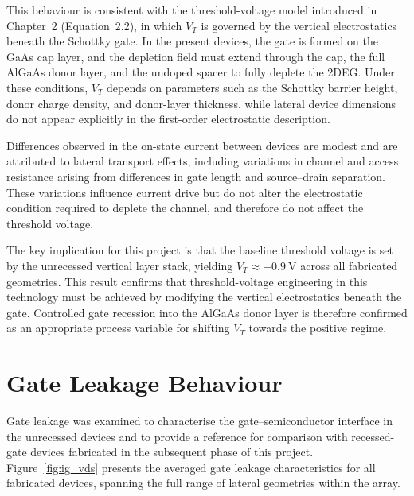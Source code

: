 \vspace{2mm}

This behaviour is consistent with the threshold-voltage model introduced in
Chapter~2 (Equation~2.2), in which $V_T$ is governed by the vertical
electrostatics beneath the Schottky gate. In the present devices, the gate is
formed on the GaAs cap layer, and the depletion field must extend through the
cap, the full AlGaAs donor layer, and the undoped spacer to fully deplete the
2DEG. Under these conditions, $V_T$ depends on parameters such as the Schottky
barrier height, donor charge density, and donor-layer thickness, while lateral
device dimensions do not appear explicitly in the first-order electrostatic
description.

\vspace{2mm}

Differences observed in the on-state current between devices are modest and
are attributed to lateral transport effects, including variations in channel
and access resistance arising from differences in gate length and
source--drain separation. These variations influence current drive but do not
alter the electrostatic condition required to deplete the channel, and
therefore do not affect the threshold voltage.

\vspace{2mm}

The key implication for this project is that the baseline threshold voltage is
set by the unrecessed vertical layer stack, yielding
$V_T \approx \SI{-0.9}{\volt}$ across all fabricated geometries. This result
confirms that threshold-voltage engineering in this technology must be
achieved by modifying the vertical electrostatics beneath the gate.
Controlled gate recession into the AlGaAs donor layer is therefore confirmed as an
appropriate process variable for shifting $V_T$ towards the positive regime.

\section{Gate Leakage Behaviour}

Gate leakage was examined to characterise the gate--semiconductor interface in
the unrecessed devices and to provide a reference for comparison with
recessed-gate devices fabricated in the subsequent phase of this project.
Figure~\ref{fig:ig_vds} presents the averaged gate leakage characteristics for
all fabricated devices, spanning the full range of lateral geometries within
the array.

